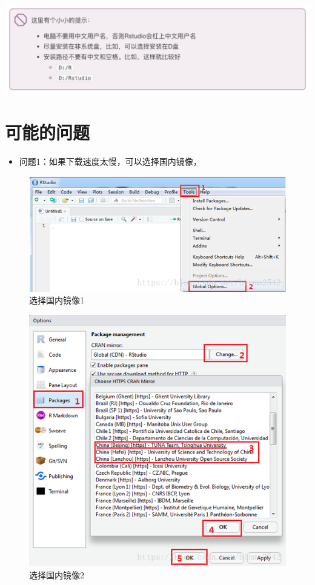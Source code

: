 \documentclass[
]{book}
\providecommand{\tightlist}{%
  \setlength{\itemsep}{0pt}\setlength{\parskip}{0pt}}
\begin{document}
\includegraphics{figure/4.png}

\hypertarget{ux53efux80fdux7684ux95eeux9898}{%
\section*{可能的问题}\label{ux53efux80fdux7684ux95eeux9898}}

\begin{itemize}
\tightlist
\item
  问题1：如果下载速度太慢，可以选择国内镜像，
\end{itemize}

\begin{figure}
\centering
\includegraphics{figure/16.png}
\caption{选择国内镜像1}
\end{figure}

\begin{figure}
\centering
\includegraphics{figure/17.png}
\caption{选择国内镜像2}
\end{figure}
\end{document}

